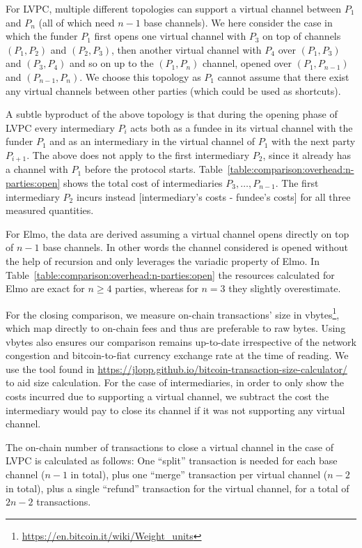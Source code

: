   For LVPC, multiple different topologies can support a virtual channel between
  $P_1$ and $P_n$ (all of which need $n-1$ base channels). We here consider the
  case in which the funder $P_1$ first opens one virtual channel with $P_3$ on
  top of channels $(P_1, P_2)$ and $(P_2, P_3)$, then another virtual channel
  with $P_4$ over $(P_1, P_3)$ and $(P_3, P_4)$ and so on up to the $(P_1, P_n)$
  channel, opened over $(P_1, P_{n-1})$ and $(P_{n-1}, P_n)$. We choose this
  topology as $P_1$ cannot assume that there exist any virtual channels between
  other parties (which could be used as shortcuts).

  A subtle byproduct of the above topology is that during the opening phase of
  LVPC every intermediary $P_i$ acts both as a fundee in its virtual channel
  with the funder $P_1$ and as an intermediary in the virtual channel of $P_1$
  with the next party $P_{i+1}$. The above does not apply to the first
  intermediary $P_2$, since it already has a channel with $P_1$ before the
  protocol starts. Table~\ref{table:comparison:overhead:n-parties:open} shows
  the total cost of intermediaries $P_3, \dots, P_{n-1}$. The first intermediary
  $P_2$ incurs instead [intermediary's costs - fundee's costs] for all three
  measured quantities.

  For Elmo, the data are derived assuming a virtual channel opens directly on
  top of $n-1$ base channels. In other words the channel considered is opened
  without the help of recursion and only leverages the variadic property of
  Elmo. In Table~\ref{table:comparison:overhead:n-parties:open} the resources
  calculated for Elmo are exact for $n \geq 4$ parties, whereas for $n = 3$ they
  slightly overestimate.

  For the closing comparison, we measure on-chain transactions' size in
  vbytes\footnote{\url{https://en.bitcoin.it/wiki/Weight_units}}, which map
  directly to on-chain fees and thus are preferable to raw bytes. Using vbytes
  also ensures our comparison remains up-to-date irrespective of the network
  congestion and bitcoin-to-fiat currency exchange rate at the time of reading.
  We use the tool found in
  \url{https://jlopp.github.io/bitcoin-transaction-size-calculator/} to aid size
  calculation. For the case of intermediaries, in order to only show
  the costs incurred due to supporting a virtual channel, we subtract the cost
  the intermediary would pay to close its channel if it was not supporting any
  virtual channel.

  The on-chain number of transactions to close a virtual channel in the case of
  LVPC is calculated as follows: One ``split'' transaction is needed for each
  base channel ($n-1$ in total), plus one ``merge'' transaction per virtual
  channel ($n-2$ in total), plus a single ``refund'' transaction for the virtual
  channel, for a total of $2n-2$ transactions.

